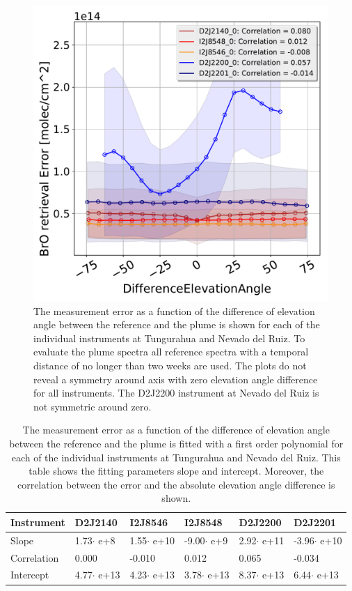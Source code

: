 \begin{figure}
	\centering
	\includegraphics[width=0.7\linewidth]{Bilder/DiffElevAngleallInstruments}
	\caption{The  measurement error as a function of the difference of elevation angle between the reference and the plume is shown for each of the individual instruments at Tungurahua and Nevado del Ruiz. To evaluate the plume spectra all reference spectra with a temporal distance of no longer than two weeks are used. The plots do not reveal a symmetry around axis with zero elevation angle difference for all instruments. The D2J2200 instrument at Nevado del Ruiz is not symmetric around zero.}
	\label{fig:diffeleangle}
\end{figure}
\begin{table}[h]
	\centering
	\begin{tabular}{|p{2cm}|p{2cm}|p{2cm}|p{2cm}|p{2cm}|p{2cm}|}
		Instrument	&D2J2140&I2J8546& I2J8548&D2J2200&D2J2201\\
		\toprule
		Slope& 1.73$\cdot$ e+8& 1.55$\cdot$ e+10  &-9.00$\cdot$ e+9 &2.92$\cdot$ e+11&-3.96$\cdot$ e+10\\
		\midrule
		Correlation&
		0.000&
		-0.010&
		0.012&
		0.065&
		-0.034\\
		\midrule
		Intercept&4.77$\cdot$ e+13&4.23$\cdot$ e+13&3.78$\cdot$ e+13&8.37$\cdot$ e+13 &6.44$\cdot$ e+13 \\
		\bottomrule
	\end{tabular}
	\caption{The  measurement error as a function of the difference of elevation angle between the reference and the plume is fitted with a first order polynomial for each of the individual instruments at Tungurahua and Nevado del Ruiz. This table shows the fitting parameters slope and intercept. Moreover, the correlation between the  error and the absolute elevation angle difference is shown. }
\end{table}
